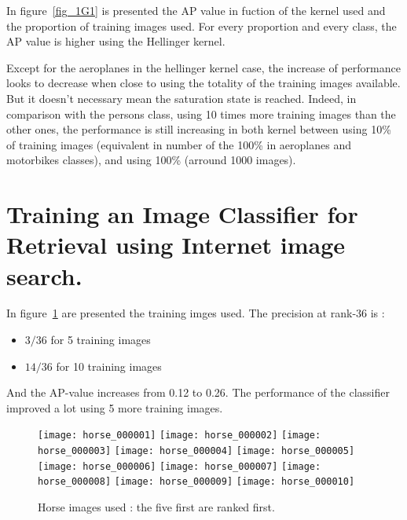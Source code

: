 \documentclass{article}
\begin{document}
In figure~\ref{fig_1G1} is presented the AP value in fuction of the kernel used and the proportion of training images used. For every proportion and every class, the AP value is higher using the Hellinger kernel.


Except for the aeroplanes in the hellinger kernel case, the increase of performance looks to decrease when close to using the totality of the training images available. But it doesn't necessary mean the saturation state is reached. Indeed, in comparison with the persons class, using 10 times more training images than the other ones, the performance is still increasing in both kernel between using 10\% of training images (equivalent in number of the 100\% in aeroplanes and motorbikes classes), and using 100\% (arround 1000 images).

\clearpage

\part{Training an Image Classifier for Retrieval using Internet image search.}


In figure~\ref{fig_2P2_1} are presented the training imges used.
The precision at rank-36 is :
\begin{itemize}
	\item \(3 / 36\) for 5 training images
	\item \(14 / 36\) for 10 training images
\end{itemize}
And the AP-value increases from 0.12 to 0.26. The performance of the classifier improved a lot using 5 more training images.

\begin{figure}[ht!]
	\centering
	\texttt{[image: horse\_000001]}
	\texttt{[image: horse\_000002]}
	\texttt{[image: horse\_000003]}
	\texttt{[image: horse\_000004]}
	\texttt{[image: horse\_000005]}
	\texttt{[image: horse\_000006]}
	\texttt{[image: horse\_000007]}
	\texttt{[image: horse\_000008]}
	\texttt{[image: horse\_000009]}
	\texttt{[image: horse\_000010]}

	\caption{Horse images used : the five first are ranked first.}
	\label{fig_2P2_1}
\end{figure}
\end{document}
